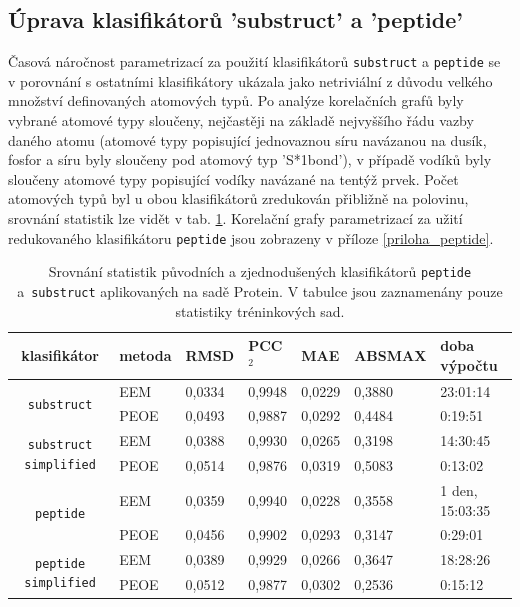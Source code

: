 \subsection{Úprava klasifikátorů 'substruct' a 'peptide'}
Časová náročnost parametrizací za použití klasifikátorů \verb|substruct| a \verb|peptide| se v porovnání s ostatními klasifikátory ukázala jako netriviální z důvodu velkého množství definovaných atomových typů. Po analýze korelačních grafů byly vybrané atomové typy sloučeny, nejčastěji na základě nejvyššího řádu vazby daného atomu (atomové typy popisující jednovaznou síru navázanou na dusík, fosfor a síru byly sloučeny pod atomový typ 'S*1bond'), v případě vodíků byly sloučeny atomové typy popisující vodíky navázané na tentýž prvek. Počet atomových typů byl u obou klasifikátorů zredukován přibližně na polovinu, srovnání statistik lze vidět v tab. \ref{statistics_simplified}. Korelační grafy parametrizací za užití  redukovaného klasifikátoru \verb|peptide| jsou zobrazeny v příloze \ref{priloha_peptide}.

\begin{table}[h]
    \renewcommand{\arraystretch}{1.4}
    \centering
    \begin{tabular}{c|l|l|l|l|l|l}
         \textbf{klasifikátor} &  \textbf{metoda} & \textbf{RMSD} & \textbf{PCC$^2$} & \textbf{MAE} & \textbf{ABSMAX} & \textbf{doba výpočtu}\\
         \hline
         \multirow{2}{6em}{\texttt{substruct}} & EEM & 0,0334 & 0,9948 & 0,0229 & 0,3880 & 23:01:14  \\
         & PEOE & 0,0493 & 0,9887 & 0,0292 & 0,4484 & 0:19:51 \\
         \hline
         \multirow{2}{6em}{\texttt{substruct simplified}} & EEM & 0,0388 & 0,9930 & 0,0265 & 0,3198 & 14:30:45 \\
         & PEOE & 0,0514 & 0,9876 & 0,0319 & 0,5083 & 0:13:02 \\
         \hline
         \multirow{2}{6em}{\texttt{peptide}} & EEM & 0,0359 & 0,9940 & 0,0228 & 0,3558 & 1 den, 15:03:35 \\
         & PEOE & 0,0456 & 0,9902 & 0,0293 & 0,3147 & 0:29:01 \\
         \hline
         \multirow{2}{6em}{\texttt{peptide simplified}} & EEM & 0,0389 & 0,9929 & 0,0266 & 0,3647 & 18:28:26 \\
         & PEOE & 0,0512 & 0,9877 & 0,0302 & 0,2536 & 0:15:12
    \end{tabular}
    \caption{Srovnání statistik původních a zjednodušených klasifikátorů \texttt{peptide} a~\texttt{substruct} aplikovaných na sadě Protein. V tabulce jsou zaznamenány pouze statistiky tréninkových sad.}
    \label{statistics_simplified}
\end{table}

